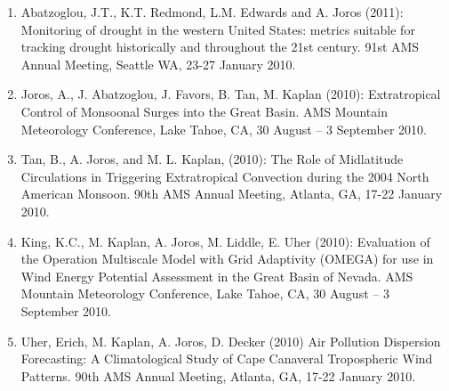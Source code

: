 \documentclass[letterpaper,11pt]{article}
\begin{document}
\begin{enumerate}[leftmargin=0.25in, label=\arabic*.]
    \item Abatzoglou, J.T., K.T. Redmond, L.M. Edwards and A. Joros (2011): Monitoring of drought in the western United States: metrics suitable for tracking drought historically and throughout the 21st century. 91st AMS Annual Meeting, Seattle WA, 23-27 January 2010.
    \item Joros, A., J. Abatzoglou, J. Favors, B. Tan, M. Kaplan (2010): Extratropical Control of Monsoonal Surges into the Great Basin. AMS Mountain Meteorology Conference, Lake Tahoe, CA, 30 August – 3 September 2010.
    \item Tan, B., A. Joros, and M. L. Kaplan, (2010): The Role of Midlatitude Circulations in Triggering Extratropical Convection during the 2004 North American Monsoon. 90th AMS Annual Meeting, Atlanta, GA, 17-22 January 2010.
    \item King, K.C., M. Kaplan, A. Joros, M. Liddle, E. Uher (2010): Evaluation of the Operation Multiscale Model with Grid Adaptivity (OMEGA) for use in Wind Energy Potential Assessment in the Great Basin of Nevada. AMS Mountain Meteorology Conference, Lake Tahoe, CA, 30 August – 3 September 2010.
    \item Uher, Erich, M. Kaplan, A. Joros, D. Decker (2010) Air Pollution Dispersion Forecasting: A Climatological Study of Cape Canaveral Tropospheric Wind Patterns. 90th AMS Annual Meeting, Atlanta, GA, 17-22 January 2010.
 \end{enumerate}


\end{document}
